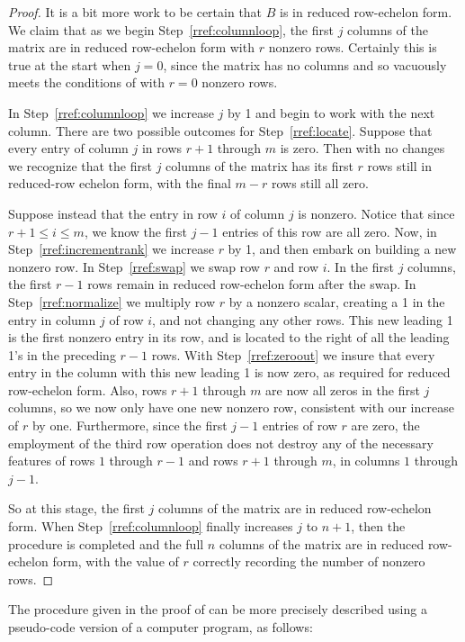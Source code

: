 \begin{proof}
%
It is a bit more work to be certain that $B$ is in reduced row-echelon form.
We claim that as we begin Step~\ref{rref:columnloop}, the first $j$ columns of the matrix are in reduced row-echelon form with $r$ nonzero rows.   Certainly this is true at the start when $j=0$, since the matrix has no columns and so vacuously meets the conditions of  with $r=0$ nonzero rows.\par
%
In Step~\ref{rref:columnloop} we increase $j$ by 1 and begin to work with the next column.  There are two possible outcomes for Step~\ref{rref:locate}.  Suppose that every entry of column $j$ in rows $r+1$ through $m$ is zero.  Then with no changes we recognize that the first $j$ columns of the matrix has its first $r$ rows still in reduced-row echelon form, with the final $m-r$ rows still all zero.\par
%
Suppose instead that the entry in row $i$ of column $j$ is nonzero.  Notice that since $r+1\leq i\leq m$, we know the first $j-1$ entries of this row are all zero.  Now, in Step~\ref{rref:incrementrank} we increase $r$ by 1, and then embark on building a new nonzero row.  In Step~\ref{rref:swap} we swap row $r$ and row $i$.  In the first $j$ columns, the first $r-1$ rows remain in reduced row-echelon form after the swap.  In Step~\ref{rref:normalize} we multiply row $r$ by a nonzero scalar, creating a 1 in the entry in column $j$ of row $i$, and not changing any other rows.  This new leading 1 is the first nonzero entry in its row, and is located to the right of all the leading 1's in the preceding $r-1$ rows.  With Step~\ref{rref:zeroout} we insure that every entry in the column with this new leading 1 is now zero, as required for reduced row-echelon form.  Also, rows $r+1$ through $m$ are now all zeros in the first $j$ columns, so we now only have one new nonzero row, consistent with our increase of $r$ by one.  Furthermore, since the first $j-1$ entries of row $r$ are zero, the employment of the third row operation does not destroy any of the necessary features of rows $1$ through $r-1$ and rows $r+1$ through $m$, in columns $1$ through $j-1$.\par
%
So at this stage, the first $j$ columns of the matrix are in reduced row-echelon form.  When Step~\ref{rref:columnloop} finally increases $j$ to $n+1$, then the procedure is completed and the full $n$ columns of the matrix are in reduced row-echelon form, with the value of $r$ correctly recording the number of nonzero rows.
%
\end{proof}
%
The procedure given in the proof of  can be more precisely described using a pseudo-code version of a computer program, as follows:
